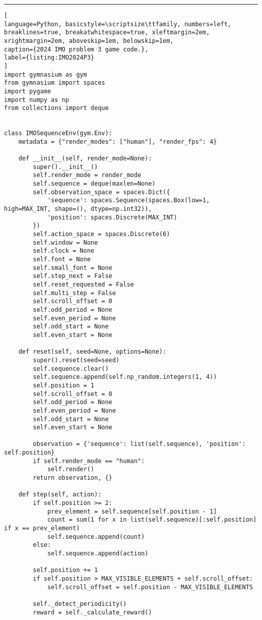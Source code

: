 \hrule
\begin{lstlisting}[
language=Python, basicstyle=\scriptsize\ttfamily, numbers=left, breaklines=true, breakatwhitespace=true, xleftmargin=2em, xrightmargin=2em, aboveskip=1em, belowskip=1em,
caption={2024 IMO problem 3 game code.},
label={listing:IMO2024P3}
]
import gymnasium as gym
from gymnasium import spaces
import pygame
import numpy as np
from collections import deque


class IMOSequenceEnv(gym.Env):
    metadata = {"render_modes": ["human"], "render_fps": 4}

    def __init__(self, render_mode=None):
        super().__init__()
        self.render_mode = render_mode
        self.sequence = deque(maxlen=None)
        self.observation_space = spaces.Dict({
            'sequence': spaces.Sequence(spaces.Box(low=1, high=MAX_INT, shape=(), dtype=np.int32)),
            'position': spaces.Discrete(MAX_INT)
        })
        self.action_space = spaces.Discrete(6)
        self.window = None
        self.clock = None
        self.font = None
        self.small_font = None
        self.step_next = False
        self.reset_requested = False
        self.multi_step = False
        self.scroll_offset = 0
        self.odd_period = None
        self.even_period = None
        self.odd_start = None
        self.even_start = None

    def reset(self, seed=None, options=None):
        super().reset(seed=seed)
        self.sequence.clear()
        self.sequence.append(self.np_random.integers(1, 4))
        self.position = 1
        self.scroll_offset = 0
        self.odd_period = None
        self.even_period = None
        self.odd_start = None
        self.even_start = None

        observation = {'sequence': list(self.sequence), 'position': self.position}
        if self.render_mode == "human":
            self.render()
        return observation, {}

    def step(self, action):
        if self.position >= 2:
            prev_element = self.sequence[self.position - 1]
            count = sum(1 for x in list(self.sequence)[:self.position] if x == prev_element)
            self.sequence.append(count)
        else:
            self.sequence.append(action)

        self.position += 1
        if self.position > MAX_VISIBLE_ELEMENTS + self.scroll_offset:
            self.scroll_offset = self.position - MAX_VISIBLE_ELEMENTS

        self._detect_periodicity()
        reward = self._calculate_reward()


\end{lstlisting}
